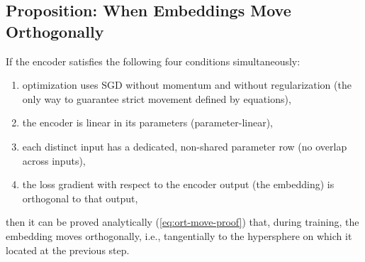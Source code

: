 \subsection{Proposition: When Embeddings Move Orthogonally}

If the encoder satisfies the following four conditions simultaneously:
\begin{enumerate}
  \item optimization uses SGD without momentum and without regularization (the only way to guarantee strict movement defined by equations), 
  \item the encoder is linear in its parameters (parameter-linear),
  \item each distinct input has a dedicated, non-shared parameter row (no overlap across inputs),
  \item the loss gradient with respect to the encoder output (the embedding) is orthogonal to that output,
\end{enumerate}

then it can be proved analytically (\ref{eq:ort-move-proof}) that, during training, the embedding moves orthogonally, i.e., tangentially to the hypersphere on which it located at the previous step.


